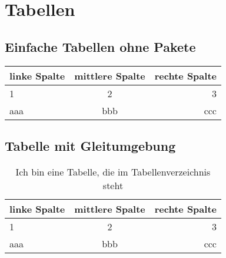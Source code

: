 \chapter{Tabellen}
    \section{Einfache Tabellen ohne Pakete}

        \begin{tabular}{l|c|r}
            linke Spalte & mittlere Spalte & rechte Spalte \\\hline
            1            &        2        &             3 \\
            aaa          &       bbb       &           ccc
        \end{tabular}

    \section{Tabelle mit Gleitumgebung}

        \begin{table}[htb]                                                    %
            \centering                                                            %
            \begin{tabular}{l|c|r}                                                %
                linke Spalte & mittlere Spalte & rechte Spalte \\\hline
                1            &        2        &             3 \\
                aaa          &       bbb       &           ccc
            \end{tabular}
            \caption{Ich bin eine Tabelle, die im Tabellenverzeichnis steht}    %
            \label{tab:table}                                                    %
        \end{table}

